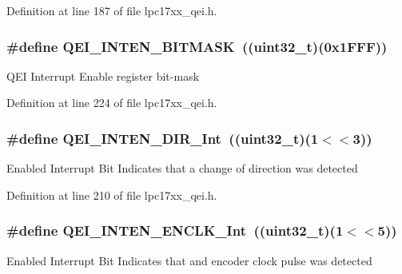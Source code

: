 \-Definition at line 187 of file lpc17xx\-\_\-qei.\-h.

\hypertarget{group___q_e_i___private___macros_gab5438a0437724b716e8af4491e4739b9}{
\subsubsection[{\-Q\-E\-I\-\_\-\-I\-N\-T\-E\-N\-\_\-\-B\-I\-T\-M\-A\-S\-K}]{\setlength{\rightskip}{0pt plus 5cm}\#define {\bf \-Q\-E\-I\-\_\-\-I\-N\-T\-E\-N\-\_\-\-B\-I\-T\-M\-A\-S\-K}~((uint32\-\_\-t)(0x1\-F\-F\-F))}}\label{group___q_e_i___private___macros_gab5438a0437724b716e8af4491e4739b9}
\-Q\-E\-I \-Interrupt \-Enable register bit-\/mask 

\-Definition at line 224 of file lpc17xx\-\_\-qei.\-h.

\hypertarget{group___q_e_i___private___macros_ga01f332cb45f8259c0a4072b6ee80fc7d}{
\subsubsection[{\-Q\-E\-I\-\_\-\-I\-N\-T\-E\-N\-\_\-\-D\-I\-R\-\_\-\-Int}]{\setlength{\rightskip}{0pt plus 5cm}\#define {\bf \-Q\-E\-I\-\_\-\-I\-N\-T\-E\-N\-\_\-\-D\-I\-R\-\_\-\-Int}~((uint32\-\_\-t)(1$<$$<$3))}}\label{group___q_e_i___private___macros_ga01f332cb45f8259c0a4072b6ee80fc7d}
\-Enabled \-Interrupt \-Bit \-Indicates that a change of direction was detected 

\-Definition at line 210 of file lpc17xx\-\_\-qei.\-h.

\hypertarget{group___q_e_i___private___macros_ga508781366470b020aef34d56da4fb08e}{
\subsubsection[{\-Q\-E\-I\-\_\-\-I\-N\-T\-E\-N\-\_\-\-E\-N\-C\-L\-K\-\_\-\-Int}]{\setlength{\rightskip}{0pt plus 5cm}\#define {\bf \-Q\-E\-I\-\_\-\-I\-N\-T\-E\-N\-\_\-\-E\-N\-C\-L\-K\-\_\-\-Int}~((uint32\-\_\-t)(1$<$$<$5))}}\label{group___q_e_i___private___macros_ga508781366470b020aef34d56da4fb08e}
\-Enabled \-Interrupt \-Bit \-Indicates that and encoder clock pulse was detected 

